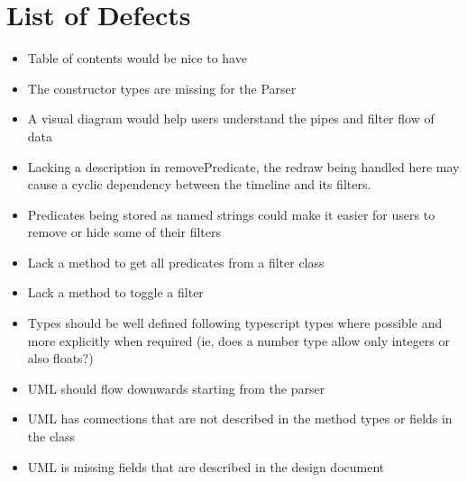 \documentclass{article}
\begin{document}
\section{List of Defects}
\begin{itemize}
    \item Table of contents would be nice to have
    \item The constructor types are missing for the Parser
    \item A visual diagram would help users understand the pipes and filter flow of data
    \item Lacking a description in removePredicate, the redraw being handled here may cause a cyclic dependency between the timeline and its filters.
    \item Predicates being stored as named strings could make it easier for users to remove or hide some of their filters
    \item Lack a method to get all predicates from a filter class
    \item Lack a method to toggle a filter
    \item Types should be well defined following typescript types where possible and more explicitly when required (ie, does a number type allow only integers or also floats?)
    \item UML should flow downwards starting from the parser
    \item UML has connections that are not described in the method types or fields in the class
    \item UML is missing fields that are described in the design document
\end{itemize}
\end{document}
